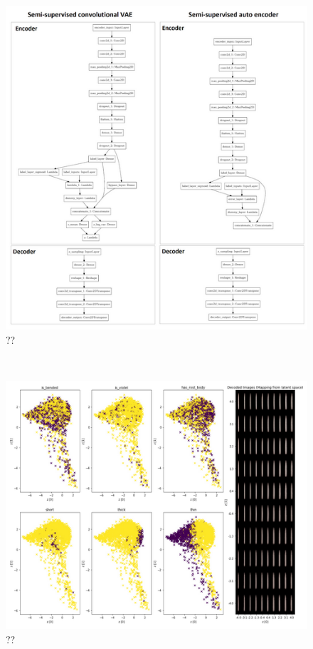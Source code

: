 \begin{figure}[h]
	\centering
	\includegraphics[scale=0.8]{Figures/chapter04/vae}
	\decoRule
	\caption[??]{??}
	\label{fig:VAE}
\end{figure}
\\
\begin{figure}[h]
	\centering
	\includegraphics[scale=0.8]{Figures/chapter04/vae_2}
	\decoRule
	\caption[??]{??}
	\label{fig:VAE2}
\end{figure}
\\

